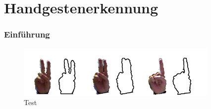 \section{Handgestenerkennung}

\begin{frame}
	\frametitle{Einführung}
		\begin{figure}
				\includegraphics[width=0.4\linewidth]{figures/gesture1.png}
				\caption{Test}
				\label{fig:Normale}
	\end{figure}
\end{frame}
